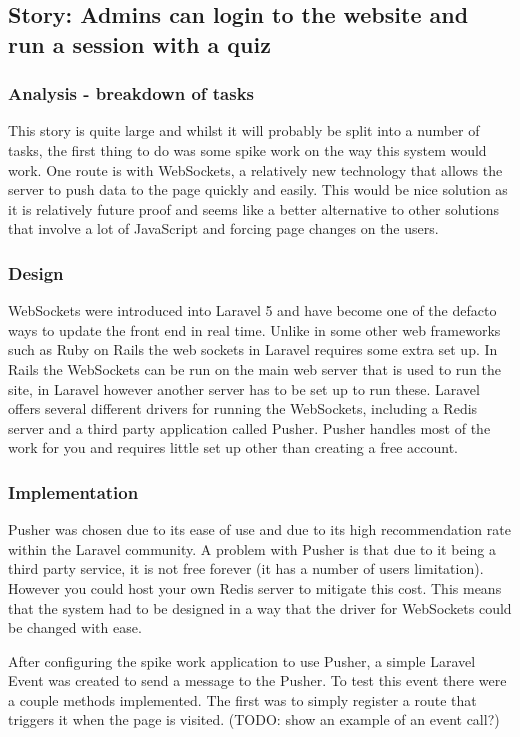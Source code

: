 \subsection{Story: Admins can login to the website and run a session with a quiz}
\subsubsection{Analysis - breakdown of tasks}
This story is quite large and whilst it will probably be split into a number of tasks, the first thing to do was some spike work on the way this system would work. One route is with WebSockets, a relatively new technology that allows the server to push data to the page quickly and easily\cite{websockets}. This would be nice solution as it is relatively future proof and seems like a better alternative to other solutions that involve a lot of JavaScript and forcing page changes on the users.
\subsubsection{Design}
WebSockets were introduced into Laravel 5 and have become one of the defacto ways to update the front end in real time. Unlike in some other web frameworks such as Ruby on Rails the web sockets in Laravel requires some extra set up. In Rails the WebSockets can be run on the main web server that is used to run the site\cite{rails-websockets}, in Laravel however another server has to be set up to run these. Laravel offers several different drivers for running the WebSockets, including a Redis server and a third party application called Pusher\cite{laravel-broadcasting}. Pusher handles most of the work for you and requires little set up other than creating a free account\cite{pusher-what-is}.
\subsubsection{Implementation}
Pusher was chosen due to its ease of use and due to its high recommendation rate within the Laravel community. A problem with Pusher is that due to it being a third party service, it is not free forever (it has a number of users limitation). However you could host your own Redis server to mitigate this cost. This means that the system had to be designed in a way that the driver for WebSockets could be changed with ease.

After configuring the spike work application to use Pusher, a simple Laravel Event was created to send a message to the Pusher. To test this event there were a couple methods implemented. The first was to simply register a route that triggers it when the page is visited. (TODO: show an example of an event call?)
 

